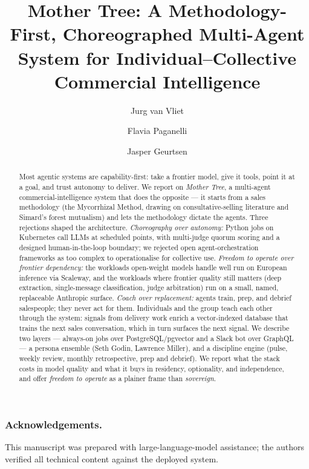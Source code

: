 \documentclass[runningheads,a4paper]{llncs}
\begin{document}
\title{Mother Tree: A Methodology-First, Choreographed Multi-Agent System for Individual--Collective Commercial Intelligence}

\author{Jurg van Vliet \and
        Flavia Paganelli \and
        Jasper Geurtsen}


\maketitle

\begin{abstract}
Most agentic systems are capability-first: take a frontier model, give it tools, point it at a goal, and trust autonomy to deliver. We report on \emph{Mother Tree}, a multi-agent commercial-intelligence system that does the opposite --- it starts from a sales methodology (the Mycorrhizal Method, drawing on consultative-selling literature and Simard's forest mutualism) and lets the methodology dictate the agents. Three rejections shaped the architecture. \emph{Choreography over autonomy:} Python jobs on Kubernetes call LLMs at scheduled points, with multi-judge quorum scoring and a designed human-in-the-loop boundary; we rejected open agent-orchestration frameworks as too complex to operationalise for collective use. \emph{Freedom to operate over frontier dependency:} the workloads open-weight models handle well run on European inference via Scaleway, and the workloads where frontier quality still matters (deep extraction, single-message classification, judge arbitration) run on a small, named, replaceable Anthropic surface. \emph{Coach over replacement:} agents train, prep, and debrief salespeople; they never act for them. Individuals and the group teach each other through the system: signals from delivery work enrich a vector-indexed database that trains the next sales conversation, which in turn surfaces the next signal. We describe two layers --- always-on jobs over PostgreSQL/pgvector and a Slack bot over GraphQL --- a persona ensemble (Seth Godin, Lawrence Miller), and a discipline engine (pulse, weekly review, monthly retrospective, prep and debrief). We report what the stack costs in model quality and what it buys in residency, optionality, and independence, and offer \emph{freedom to operate} as a plainer frame than \emph{sovereign}.

\end{abstract}



\subsubsection*{Acknowledgements.} This manuscript was prepared with large-language-model assistance; the authors verified all technical content against the deployed system.



\end{document}
